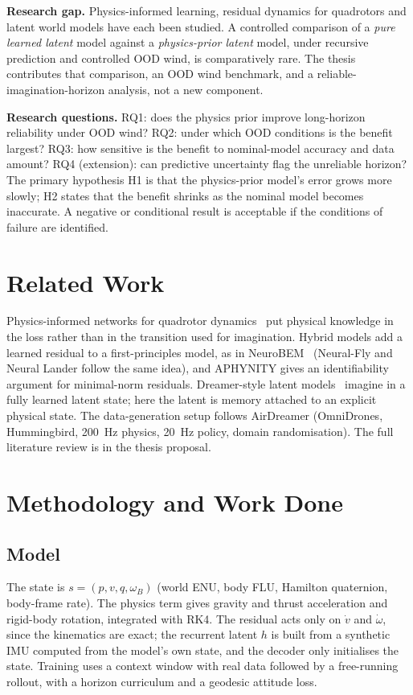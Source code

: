 \documentclass[conference]{IEEEtran}
\begin{document}
\textbf{Research gap.} Physics-informed learning, residual dynamics for quadrotors and latent world models have each been studied. A controlled comparison of a \emph{pure learned latent} model against a \emph{physics-prior latent} model, under recursive prediction and controlled OOD wind, is comparatively rare. The thesis contributes that comparison, an OOD wind benchmark, and a reliable-imagination-horizon analysis, not a new component.

\textbf{Research questions.} RQ1: does the physics prior improve long-horizon reliability under OOD wind? RQ2: under which OOD conditions is the benefit largest? RQ3: how sensitive is the benefit to nominal-model accuracy and data amount? RQ4 (extension): can predictive uncertainty flag the unreliable horizon? The primary hypothesis H1 is that the physics-prior model's error grows more slowly; H2 states that the benefit shrinks as the nominal model becomes inaccurate. A negative or conditional result is acceptable if the conditions of failure are identified.

\section{Related Work}
Physics-informed networks for quadrotor dynamics~\cite{gu2024physics} put physical knowledge in the loss rather than in the transition used for imagination. Hybrid models add a learned residual to a first-principles model, as in NeuroBEM~\cite{bauersfeld2021neurobem} (Neural-Fly and Neural Lander follow the same idea), and APHYNITY gives an identifiability argument for minimal-norm residuals. Dreamer-style latent models~\cite{hafner2023mastering} imagine in a fully learned latent state; here the latent is memory attached to an explicit physical state. The data-generation setup follows AirDreamer (OmniDrones, Hummingbird, 200~Hz physics, 20~Hz policy, domain randomisation). The full literature review is in the thesis proposal.

\section{Methodology and Work Done}
\subsection{Model}
The state is $s=(p,v,q,\omega_B)$ (world ENU, body FLU, Hamilton quaternion, body-frame rate). The physics term gives gravity and thrust acceleration and rigid-body rotation, integrated with RK4. The residual acts only on $\dot v$ and $\dot\omega$, since the kinematics are exact; the recurrent latent $h$ is built from a synthetic IMU computed from the model's own state, and the decoder only initialises the state. Training uses a context window with real data followed by a free-running rollout, with a horizon curriculum and a geodesic attitude loss.
\end{document}
